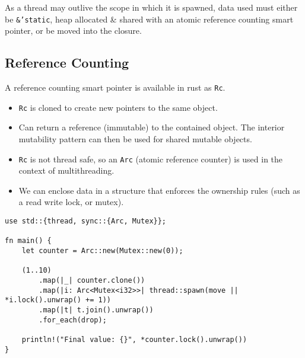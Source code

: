 As a thread may outlive the scope in which it is spawned, data used must either be \texttt{&'static}, heap allocated \& shared with an atomic reference counting smart pointer, or be moved into the closure.
\subsection{Reference Counting}
A reference counting smart pointer is available in rust as \texttt{Rc}.
\begin{itemize}
    \item \texttt{Rc} is cloned to create new pointers to the same object.
    \item Can return a reference (immutable) to the contained object. The interior mutability pattern can then be used for shared mutable objects.
    \item \texttt{Rc} is not thread safe, so an \texttt{Arc} (atomic reference counter) is used in the context of multithreading.
    \item We can enclose data in a structure that enforces the ownership rules (such as a read write lock, or mutex).
\end{itemize}
\begin{verbatim}
use std::{thread, sync::{Arc, Mutex}};

fn main() {
    let counter = Arc::new(Mutex::new(0));

    (1..10)
        .map(|_| counter.clone())
        .map(|i: Arc<Mutex<i32>>| thread::spawn(move || *i.lock().unwrap() += 1))
        .map(|t| t.join().unwrap())
        .for_each(drop);
    
    println!("Final value: {}", *counter.lock().unwrap())
}
\end{verbatim}


\unfinished